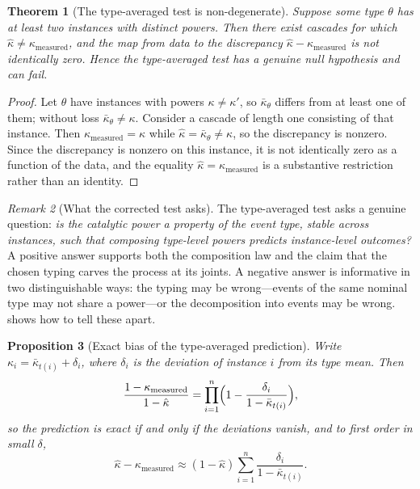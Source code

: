 \documentclass[11pt,a4paper]{article}
\theoremstyle{thmstyle}
\newtheorem{theorem}{Theorem}[section]
\newtheorem{proposition}[theorem]{Proposition}
\theoremstyle{definition}
\theoremstyle{remark}
\newtheorem{remark}[theorem]{Remark}
\newcommand{\kap}{\kappa}
\begin{document}
\begin{theorem}[The type-averaged test is non-degenerate]
\label{thm:nondegenerate}
Suppose some type $\theta$ has at least two instances with distinct powers.
Then there exist cascades for which
$\hat\kap\ne\kap_{\mathrm{measured}}$, and the map from data to the
discrepancy $\hat\kap-\kap_{\mathrm{measured}}$ is not identically zero.
Hence the type-averaged test has a genuine null hypothesis and can fail.
\end{theorem}

\begin{proof}
Let $\theta$ have instances with powers $\kap\ne\kap'$, so
$\bar\kap_\theta$ differs from at least one of them; without loss
$\bar\kap_\theta\ne\kap$. Consider a cascade of length one consisting of
that instance. Then $\kap_{\mathrm{measured}}=\kap$ while
$\hat\kap=\bar\kap_\theta\ne\kap$, so the discrepancy is nonzero. Since the
discrepancy is nonzero on this instance, it is not identically zero as a
function of the data, and the equality $\hat\kap=\kap_{\mathrm{measured}}$
is a substantive restriction rather than an identity.
\end{proof}

\begin{remark}[What the corrected test asks]
\label{rem:what-asks}
The type-averaged test asks a genuine question: \emph{is the catalytic power
a property of the event type, stable across instances, such that composing
type-level powers predicts instance-level outcomes?} A positive answer
supports both the composition law and the claim that the chosen typing
carves the process at its joints. A negative answer is informative in two
distinguishable ways: the typing may be wrong---events of the same nominal
type may not share a power---or the decomposition into events may be wrong.
 shows how to tell these apart.
\end{remark}

\begin{proposition}[Exact bias of the type-averaged prediction]
\label{prop:bias}
Write $\kap_i=\bar\kap_{t(i)}+\delta_i$, where $\delta_i$ is the deviation
of instance $i$ from its type mean. Then
\[
\frac{1-\kap_{\mathrm{measured}}}{1-\hat\kap}
=\prod_{i=1}^{n}\Bigl(1-\frac{\delta_i}{1-\bar\kap_{t(i)}}\Bigr),
\]
so the prediction is exact if and only if the deviations vanish, and to
first order in small $\delta$,
\[
\hat\kap-\kap_{\mathrm{measured}}
\approx(1-\hat\kap)\sum_{i=1}^{n}\frac{\delta_i}{1-\bar\kap_{t(i)}} .
\]
\end{proposition}
\end{document}
